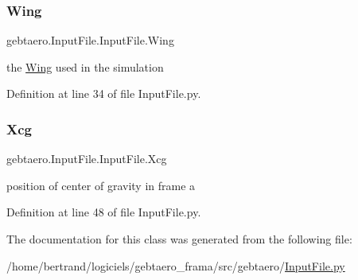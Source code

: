 \subsubsection{\texorpdfstring{Wing}{Wing}}
{\footnotesize\ttfamily gebtaero.\+Input\+File.\+Input\+File.\+Wing}



the \hyperlink{namespacegebtaero_1_1_wing}{Wing} used in the simulation 



Definition at line 34 of file Input\+File.\+py.

\mbox{\label{classgebtaero_1_1_input_file_1_1_input_file_a3e49397db5d15285d57c3df5311bf2f8}} 
\subsubsection{\texorpdfstring{Xcg}{Xcg}}
{\footnotesize\ttfamily gebtaero.\+Input\+File.\+Input\+File.\+Xcg}



position of center of gravity in frame a 



Definition at line 48 of file Input\+File.\+py.



The documentation for this class was generated from the following file\+:\begin{DoxyCompactItemize}
\item 
/home/bertrand/logiciels/gebtaero\+\_\+frama/src/gebtaero/\hyperlink{_input_file_8py}{Input\+File.\+py}\end{DoxyCompactItemize}
